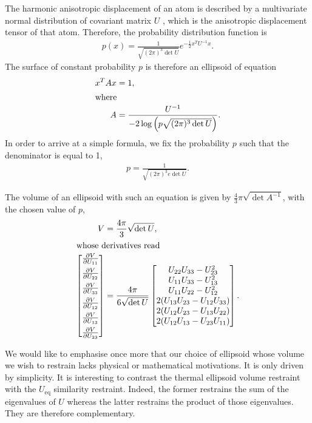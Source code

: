 \documentclass[11pt]{article}
\newcommand{\partialder}[2]{\frac{\partial #1}{\partial #2}}
\begin{document}
The harmonic anisotropic displacement of an atom is described by a multivariate normal distribution of covariant matrix $U$ , which is the anisotropic displacement tensor of that atom. Therefore, the probability distribution function is
\begin{align}
p(x) = \frac{1}{\sqrt{(2\pi)^3 \det U}} e^{-\frac{1}{2}x^T U^{-1} x}.\nonumber
\end{align}
The surface of constant probability $p$ is therefore an ellipsoid of equation
\begin{align}
x^T A x &= 1,\nonumber\\
\intertext{where}
A &= \frac{U^{-1}}{-2 \log\left( p \sqrt{(2\pi)^3 \det U} \right)}\nonumber.
\end{align}
In order to arrive at a simple formula, we fix the probability $p$ such that the denominator is equal to 1, 
\begin{align}
p = \frac{1}{\sqrt{(2\pi)^3 e \det U}}.
\end{align}

The volume of an ellipsoid with such an equation is given by $\frac{4}{3}\pi \sqrt{\det A^{-1}}$,  with the chosen value of $p$,
\begin{align}
V &= \frac{4\pi}{3}\sqrt{\det U},\\
\intertext{whose derivatives read}
\begin{bmatrix}
 \partialder{V}{U_{11}}\\[0.5em]
 \partialder{V}{U_{22}}\\[0.5em]
 \partialder{V}{U_{33}}\\[0.5em]
 \partialder{V}{U_{12}}\\[0.5em]
 \partialder{V}{U_{13}}\\[0.5em]
 \partialder{V}{U_{23}}
\end{bmatrix}
 &= \frac{4\pi}{6\sqrt{\det U}}
\begin{bmatrix}
U_{22} U_{33}-U_{23}^2\\
U_{11} U_{33}-U_{13}^2\\
U_{11} U_{22}-U_{12}^2\\
2 (U_{13} U_{23}- U_{12} U_{33})\\
2 (U_{12} U_{23}- U_{13} U_{22})\\
2 (U_{12}U_{13}- U_{23} U_{11} )
\end{bmatrix}.
\end{align}

We would like to emphasise once more that our choice of ellipsoid whose volume we wish to restrain lacks physical or mathematical motivations. It is only driven by simplicity. It is interesting to contrast the thermal ellipsoid volume restraint with the $U_\text{eq}$ similarity restraint. Indeed, the former restrains the sum of the eigenvalues of $U$ whereas the latter restrains the product of those eigenvalues. They are therefore complementary.
\end{document}

